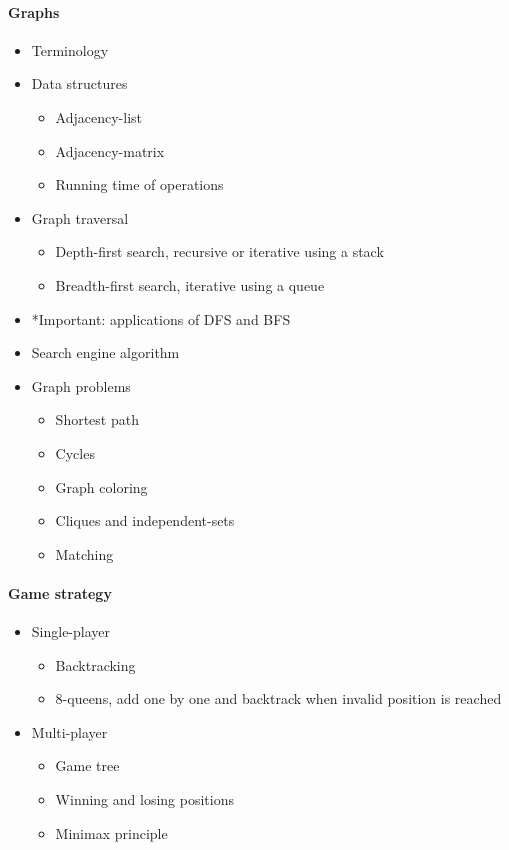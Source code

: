 \documentclass[12 pt]{article}
\theoremstyle{definition}
\begin{document}
        \paragraph{Graphs}
        \begin{itemize}
        \item Terminology
        \item Data structures
          \begin{itemize}
          \item Adjacency-list
          \item Adjacency-matrix
          \item Running time of operations
          \end{itemize}
        \item Graph traversal
          \begin{itemize}
          \item Depth-first search, recursive or iterative using a stack
          \item Breadth-first search, iterative using a queue
          \end{itemize}
          \item *Important: applications of DFS and BFS
          \item Search engine algorithm
          \item Graph problems
            \begin{itemize}
            \item Shortest path
            \item Cycles
            \item Graph coloring
            \item Cliques and independent-sets
              \item Matching
              \end{itemize}
          \end{itemize}
          \paragraph{Game strategy}
          \begin{itemize}
          \item Single-player
            \begin{itemize}
            \item Backtracking
            \item 8-queens, add one by one and backtrack when invalid position is reached
            \end{itemize}
          \item Multi-player
            \begin{itemize}
            \item Game tree
            \item Winning and losing positions
            \item Minimax principle
            \end{itemize}
          \end{itemize}
\end{document}
